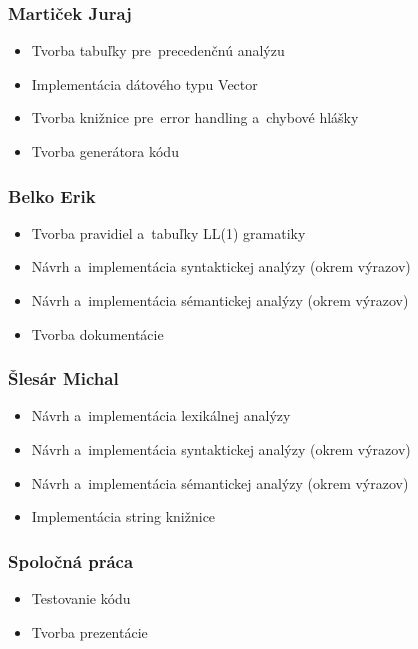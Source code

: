 \documentclass[a4paper, 12pt]{article}[25.11.2020]
\begin{document}
        \subsubsection{Martiček Juraj}
            \begin{itemize}
                \item Tvorba tabuľky pre~precedenčnú analýzu
                \item Implementácia dátového typu Vector
                \item Tvorba knižnice pre~error handling a~chybové hlášky
                \item Tvorba generátora kódu
            \end{itemize}
        \subsubsection{Belko Erik}
            \begin{itemize}
                \item Tvorba pravidiel a~tabuľky LL(1) gramatiky
                \item Návrh a~implementácia syntaktickej analýzy (okrem výrazov)
                \item Návrh a~implementácia sémantickej analýzy (okrem výrazov)
                \item Tvorba dokumentácie
            \end{itemize}
        \subsubsection{Šlesár Michal}
            \begin{itemize}
                \item Návrh a~implementácia lexikálnej analýzy
                \item Návrh a~implementácia syntaktickej analýzy (okrem výrazov)
                \item Návrh a~implementácia sémantickej analýzy (okrem výrazov)
                \item Implementácia string knižnice
            \end{itemize}
        \subsubsection{Spoločná práca}
            \begin{itemize}
                \item Testovanie kódu
                \item Tvorba prezentácie
            \end{itemize}
\end{document}
